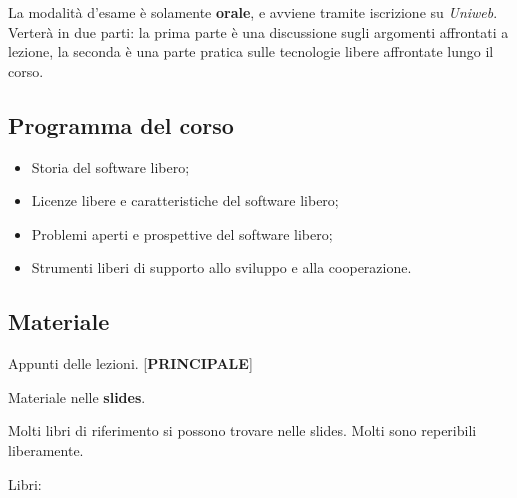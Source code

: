 La modalità d'esame è solamente \textbf{orale}, e avviene tramite iscrizione su \textit{Uniweb}. Verterà in due parti: la prima parte è una discussione sugli argomenti affrontati a lezione, la seconda è una parte pratica sulle tecnologie libere affrontate lungo il corso.

\subsection{Programma del corso}

\begin{itemize}

\item Storia del software libero;
\item Licenze libere e caratteristiche del software libero;
\item Problemi aperti e prospettive del software libero;
\item Strumenti liberi di supporto allo sviluppo e alla cooperazione.

\end{itemize}

\subsection{Materiale}

Appunti delle lezioni. [\textbf{PRINCIPALE}]

Materiale nelle \textbf{slides}.

Molti libri di riferimento si possono trovare nelle slides. Molti sono reperibili liberamente.

Libri:

